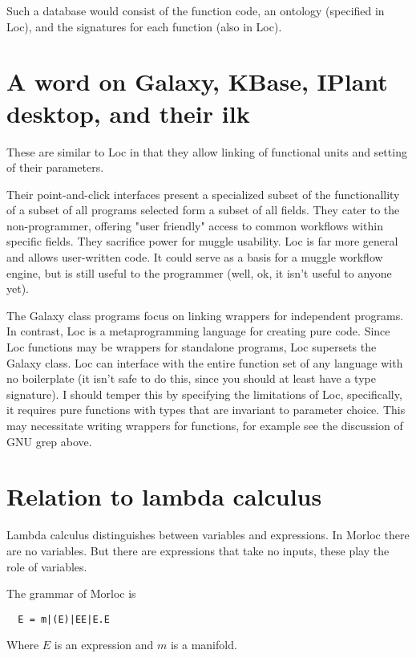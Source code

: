 \documentclass[12pt]{article}
\begin{document}
Such a database would consist of the function code, an ontology (specified in
Loc), and the signatures for each function (also in Loc).

\section{A word on Galaxy, KBase, IPlant desktop, and their ilk}

These are similar to Loc in that they allow linking of functional units and
setting of their parameters.

Their point-and-click interfaces present a specialized subset of the
functionallity of a subset of all programs selected form a subset of all
fields. They cater to the non-programmer, offering "user friendly" access to
common workflows within specific fields. They sacrifice power for muggle
usability. Loc is far more general and allows user-written code. It could serve
as a basis for a muggle workflow engine, but is still useful to the programmer
(well, ok, it isn't useful to anyone yet).

The Galaxy class programs focus on linking wrappers for independent programs.
In contrast, Loc is a metaprogramming language for creating pure code. Since
Loc functions may be wrappers for standalone programs, Loc supersets the Galaxy
class. Loc can interface with the entire function set of any language with no
boilerplate (it isn't safe to do this, since you should at least have a type
signature). I should temper this by specifying the limitations of Loc,
specifically, it requires pure functions with types that are invariant to
parameter choice. This may necessitate writing wrappers for functions, for
example see the discussion of GNU grep above.

\section{Relation to lambda calculus}

Lambda calculus distinguishes between variables and expressions. In Morloc there
are no variables. But there are expressions that take no inputs, these play the
role of variables.

The grammar of Morloc is

\begin{verbatim}
  E = m|(E)|EE|E.E
\end{verbatim}

Where $E$ is an expression and $m$ is a manifold.
\end{document}
